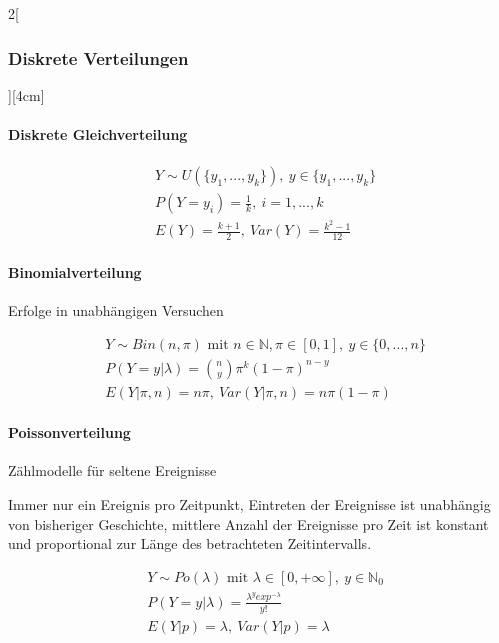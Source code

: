 \documentclass[8pt]{extarticle}
\begin{document}
\begin{multicols}{2}[\subsubsection{Diskrete Verteilungen}][4cm]

  \paragraph{Diskrete Gleichverteilung}
  
    \begin{align*}
    & Y \sim U(\{y_1, ..., y_k\}),\: y \in \{y_1, ..., y_k\} \\
    & P(Y=y_i) =\frac{1}{k},\: i = 1, ...,k \\
    & E(Y) = \frac{k+1}{2} ,\: Var(Y) = \frac{k^2 - 1}{12}
  \end{align*}
  
    \paragraph{Binomialverteilung}
  Erfolge in unabhängigen Versuchen 

  \begin{align*}
    & Y \sim Bin(n, \pi) \text{ mit } n \in \mathbb{N}, \pi \in \left[0,1\right] ,\: y \in \{0, ..., n\} \\
    & P(Y=y|\lambda) = \binom{n}{y}\pi^k(1-\pi)^{n-y} \\
    & E(Y|\pi,n) = n\pi ,\: Var(Y|\pi,n) = n\pi(1-\pi)
  \end{align*}

  \paragraph{Poissonverteilung}
  Zählmodelle für seltene Ereignisse

\begin{Annahmen}
\noindent Immer nur ein Ereignis pro Zeitpunkt, Eintreten der Ereignisse ist unabhängig von bisheriger Geschichte, mittlere Anzahl der Ereignisse pro Zeit ist konstant und proportional zur Länge des betrachteten Zeitintervalls.
  
\end{Annahmen}

  \begin{align*}
    & Y \sim Po(\lambda) \text{ mit } \lambda \in \left[ 0, + \infty \right] ,\: y \in \mathbb{N}_0 \\
    & P(Y=y|\lambda) =\frac{\lambda^y exp^{-\lambda}}{y!} \\
    & E(Y|p) = \lambda ,\: Var(Y|p) = \lambda
  \end{align*}


\end{multicols}
\end{document}
